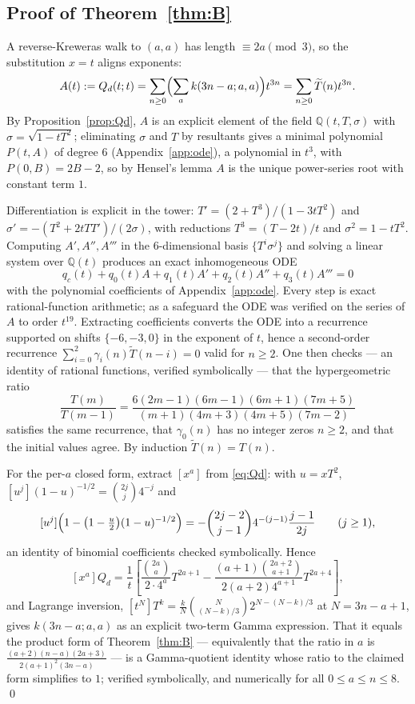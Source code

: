 \documentclass[11pt]{article}
\theoremstyle{definition}
\begin{document}
\subsection{Proof of Theorem~\ref{thm:B}}

A reverse-Kreweras walk to $(a,a)$ has length $\equiv2a\pmod3$, so the
substitution $x=t$ aligns exponents:
\[
  A(t):=Q_d(t;t)=\sum_{n\ge0}\Bigl(\sum_a k(3n-a;a,a)\Bigr)t^{3n}
  =\sum_{n\ge0}\widetilde T(n)t^{3n}.
\]
By Proposition~\ref{prop:Qd}, $A$ is an explicit element of the field
$\mathbb{Q}(t,T,\sigma)$ with $\sigma=\sqrt{1-tT^{2}}$; eliminating $\sigma$
and $T$ by resultants gives a minimal polynomial $P(t,A)$ of degree $6$
(Appendix~\ref{app:ode}), a polynomial in $t^{3}$, with $P(0,B)=2B-2$, so by
Hensel's lemma $A$ is the unique power-series root with constant term $1$.

Differentiation is explicit in the tower: $T'=(2+T^{3})/(1-3tT^{2})$ and
$\sigma'=-(T^{2}+2tTT')/(2\sigma)$, with reductions $T^{3}=(T-2t)/t$ and
$\sigma^{2}=1-tT^{2}$. Computing $A',A'',A'''$ in the $6$-dimensional basis
$\{T^{i}\sigma^{j}\}$ and solving a linear system over $\mathbb{Q}(t)$ produces
an exact inhomogeneous ODE
\[
  q_c(t)+q_0(t)A+q_1(t)A'+q_2(t)A''+q_3(t)A'''=0
\]
with the polynomial coefficients of Appendix~\ref{app:ode}. Every step is exact
rational-function arithmetic; as a safeguard the ODE was verified on the series
of $A$ to order $t^{19}$. Extracting coefficients converts the ODE into a
recurrence supported on shifts $\{-6,-3,0\}$ in the exponent of $t$, hence a
second-order recurrence $\sum_{i=0}^{2}\gamma_i(n)\widetilde T(n-i)=0$ valid
for $n\ge2$. One then checks --- an identity of rational functions, verified
symbolically --- that the hypergeometric ratio
\[
  \frac{T(m)}{T(m-1)}
  =\frac{6(2m-1)(6m-1)(6m+1)(7m+5)}{(m+1)(4m+3)(4m+5)(7m-2)}
\]
satisfies the same recurrence, that $\gamma_0(n)$ has no integer zeros $n\ge2$,
and that the initial values agree. By induction $\widetilde T(n)=T(n)$.

For the per-$a$ closed form, extract $[x^{a}]$ from \eqref{eq:Qd}: with
$u=xT^{2}$, $[u^{j}](1-u)^{-1/2}=\binom{2j}{j}4^{-j}$ and
\[
  [u^{j}]\Bigl(1-\bigl(1-\tfrac u2\bigr)(1-u)^{-1/2}\Bigr)
  =-\binom{2j-2}{j-1}4^{-(j-1)}\frac{j-1}{2j}\qquad(j\ge1),
\]
an identity of binomial coefficients checked symbolically. Hence
\[
  [x^{a}]Q_d=\frac1t\left[\frac{\binom{2a}{a}}{2\cdot4^{a}}T^{2a+1}
   -\frac{(a+1)\binom{2a+2}{a+1}}{2(a+2)4^{a+1}}T^{2a+4}\right],
\]
and Lagrange inversion, $[t^{N}]T^{k}=\frac kN\binom{N}{(N-k)/3}2^{N-(N-k)/3}$
at $N=3n-a+1$, gives $k(3n-a;a,a)$ as an explicit two-term Gamma expression.
That it equals the product form of Theorem~\ref{thm:B} --- equivalently that
the ratio in $a$ is $\frac{(a+2)(n-a)(2a+3)}{2(a+1)^{2}(3n-a)}$ --- is a
Gamma-quotient identity whose ratio to the claimed form simplifies to $1$;
verified symbolically, and numerically for all $0\le a\le n\le8$. \qed
\end{document}
